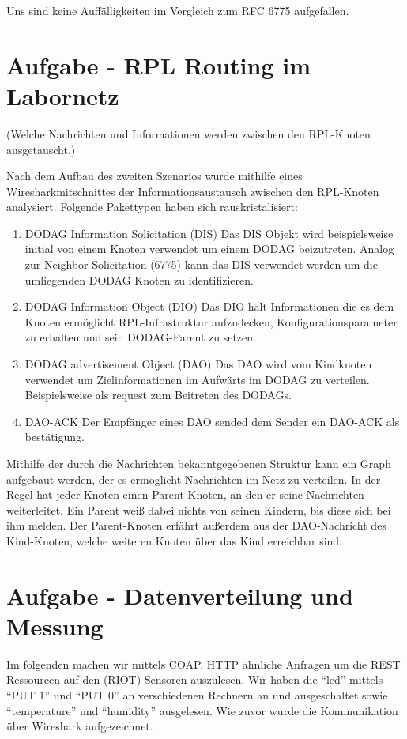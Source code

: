 \documentclass[paper=a4, fontsize=11pt]{scrartcl} %
\numberwithin{equation}{section} %
\numberwithin{figure}{section} %
\numberwithin{table}{section} %
\begin{document}
Uns sind keine Auffälligkeiten im Vergleich zum RFC 6775 aufgefallen.

\section{Aufgabe - RPL Routing im Labornetz}

(Welche Nachrichten und Informationen werden zwischen den RPL-Knoten ausgetauscht.)

Nach dem Aufbau des zweiten Szenarios wurde mithilfe eines Wiresharkmitschnittes der Informationsaustausch zwischen den RPL-Knoten analysiert. Folgende Pakettypen haben sich rauskristalisiert:
\begin{enumerate}
  \item DODAG Information Solicitation (DIS)
  Das DIS Objekt wird beispielsweise initial von einem Knoten verwendet um einem DODAG beizutreten. Analog zur Neighbor Solicitation (6775) kann das DIS verwendet werden um die umliegenden DODAG Knoten zu identifizieren.
  \item DODAG Information Object (DIO)
  Das DIO hält Informationen die es dem Knoten ermöglicht RPL-Infrastruktur aufzudecken, Konfigurationsparameter zu erhalten und sein DODAG-Parent zu setzen.
  \item DODAG advertisement Object (DAO)
  Das DAO wird vom Kindknoten verwendet um Zielinformationen im Aufwärts im DODAG zu verteilen. Beispielsweise als request zum Beitreten des DODAGs.
  \item DAO-ACK
  Der Empfänger eines DAO sended dem Sender ein DAO-ACK als bestätigung.
\end{enumerate}

Mithilfe der durch die Nachrichten bekanntgegebenen Struktur kann ein Graph aufgebaut werden, der es ermöglicht Nachrichten im Netz zu verteilen. In der Regel hat jeder Knoten einen Parent-Knoten, an den er seine Nachrichten weiterleitet. Ein Parent weiß dabei nichts von seinen Kindern, bis diese sich bei ihm melden. Der Parent-Knoten erfährt außerdem aus der DAO-Nachricht des Kind-Knoten, welche weiteren Knoten über das Kind erreichbar sind.

\section{Aufgabe - Datenverteilung und Messung}

Im folgenden machen wir mittels COAP, HTTP ähnliche Anfragen um die REST Ressourcen auf den (RIOT) Sensoren auszulesen. Wir haben die ``led'' mittels ``PUT 1'' und ``PUT 0'' an verschiedenen Rechnern an und ausgeschaltet sowie ``temperature'' und ``humidity'' ausgelesen. Wie zuvor wurde die Kommunikation über Wireshark aufgezeichnet.
\end{document}
